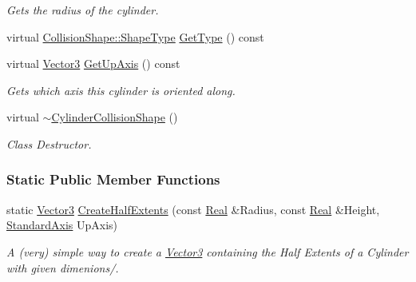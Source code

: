 \begin{DoxyCompactItemize}
\begin{DoxyCompactList}\small\item\em Gets the radius of the cylinder. \item\end{DoxyCompactList}\item 
virtual \hyperlink{classMezzanine_1_1CollisionShape_ad04186055565998879b64176d6dd100d}{CollisionShape::ShapeType} \hyperlink{classMezzanine_1_1CylinderCollisionShape_a4feb07a9d71bda6ca4b6c82b745df8a0}{GetType} () const 
\item 
virtual \hyperlink{classMezzanine_1_1Vector3}{Vector3} \hyperlink{classMezzanine_1_1CylinderCollisionShape_a4c99a3d61ba0a4cbeb2df3d54e625541}{GetUpAxis} () const 
\begin{DoxyCompactList}\small\item\em Gets which axis this cylinder is oriented along. \item\end{DoxyCompactList}\item 
\hypertarget{classMezzanine_1_1CylinderCollisionShape_a6479b7afe2caab5b4682903ea6a1bee5}{
virtual \hyperlink{classMezzanine_1_1CylinderCollisionShape_a6479b7afe2caab5b4682903ea6a1bee5}{$\sim$CylinderCollisionShape} ()}
\label{classMezzanine_1_1CylinderCollisionShape_a6479b7afe2caab5b4682903ea6a1bee5}

\begin{DoxyCompactList}\small\item\em Class Destructor. \item\end{DoxyCompactList}\end{DoxyCompactItemize}
\subsubsection*{Static Public Member Functions}
\begin{DoxyCompactItemize}
\item 
static \hyperlink{classMezzanine_1_1Vector3}{Vector3} \hyperlink{classMezzanine_1_1CylinderCollisionShape_af084233b246cdf7497ed2739d9ba361e}{CreateHalfExtents} (const \hyperlink{namespaceMezzanine_a726731b1a7df72bf3583e4a97282c6f6}{Real} \&Radius, const \hyperlink{namespaceMezzanine_a726731b1a7df72bf3583e4a97282c6f6}{Real} \&Height, \hyperlink{namespaceMezzanine_ab41a00a8c6a47b576dc987ec34e16ba1}{StandardAxis} UpAxis)
\begin{DoxyCompactList}\small\item\em A (very) simple way to create a \hyperlink{classMezzanine_1_1Vector3}{Vector3} containing the Half Extents of a Cylinder with given dimenions/. \item\end{DoxyCompactList}\end{DoxyCompactItemize}

